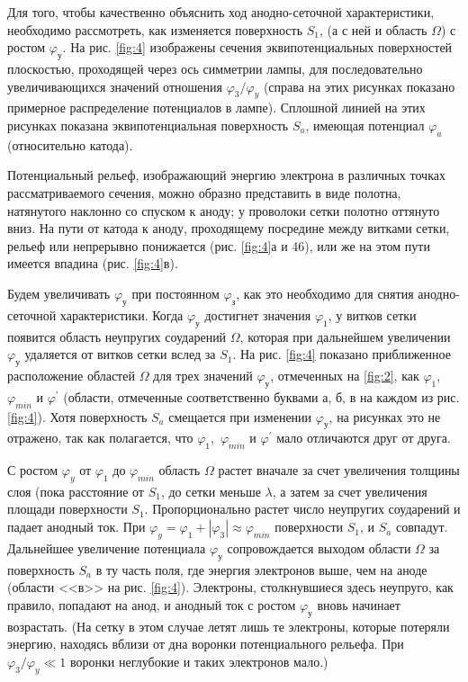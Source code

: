 Для того, чтобы качественно объяснить ход анодно-сеточной характеристики, необходимо рассмотреть, как изменяется поверхность $S_1$, (а с ней и область $\Omega$) с ростом $\varphi_{у}$. На рис. \ref{fig:4} изображены сечения эквипотенциальных поверхностей плоскостью, проходящей через ось симметрии лампы, для последовательно увеличивающихся значений отношения $\varphi_{3} /\varphi_{y}$ (справа на этих рисунках показано примерное распределение потенциалов в лампе). Сплошной линией на этих рисунках показана эквипотенциальная поверхность $S_a$, имеющая потенциал $\varphi_{a}$ (относительно катода).

Потенциальный рельеф, изображающий энергию электрона в различных точках рассматриваемого сечения, можно образно представить в виде полотна, натянутого наклонно со спуском к аноду; у проволоки сетки полотно оттянуто вниз. На пути от катода к аноду, проходящему посредине между витками сетки, рельеф или непрерывно понижается (рис. \ref{fig:4}а и 46), или же на этом пути имеется впадина (рис. \ref{fig:4}в).

Будем увеличивать $\varphi_{у}$ при постоянном $\varphi_{з}$, как это необходимо для снятия анодно-сеточной характеристики. Когда $\varphi_{у}$ достигнет значения $\varphi_{1}$, у витков сетки появится область неупругих соударений $\Omega$, которая при дальнейшем увеличении $\varphi_{у}$ удаляется от витков сетки вслед за $S_1$. На рис. \ref{fig:4} показано
приближенное расположение областей $\Omega$ для трех значений $\varphi_{у}$, отмеченных на \ref{fig:2}, как $\varphi_{1}$,~$\varphi_{min}$ и $\varphi^{'}$ (области, отмеченные соответственно буквами а, б, в на каждом из рис. \ref{fig:4}). Хотя поверхность $S_a$ смещается при изменении $\varphi_{у}$, на рисунках это не отражено, так как полагается, что $\varphi_{1}$,~$\varphi_{min}$ и $\varphi^{'}$ мало отличаются друг от друга.

С ростом $\varphi_{y}$ от $\varphi_{1}$ до $\varphi_{min}$ область $\Omega$ растет вначале за счет увеличения толщины слоя (пока расстояние от $S_1$, до сетки меньше $\lambda$, а затем за счет увеличения площади поверхности $S_1$. Пропорционально растет число неупругих соударений и падает анодный ток. При $\varphi_{y}= \varphi_{1}+|\varphi_{3}| \approx \varphi_{min}$ поверхности $S_1$, и $S_a$ совпадут. Дальнейшее увеличение потенциала $\varphi_{у}$ сопровождается выходом области $\Omega$ за поверхность $S_a$ в ту часть поля, где энергия электронов выше, чем на аноде (области <<в>> на рис. \ref{fig:4}). Электроны, столкнувшиеся здесь неупруго, как правило, попадают на анод, и анодный ток с ростом $\varphi_{у}$ вновь начинает возрастать. (На сетку в этом случае летят лишь те электроны, которые потеряли энергию, находясь вблизи от дна воронки потенциального рельефа. При $\varphi_{3} /\varphi_{y} \ll 1$ воронки неглубокие и таких электронов мало.)

